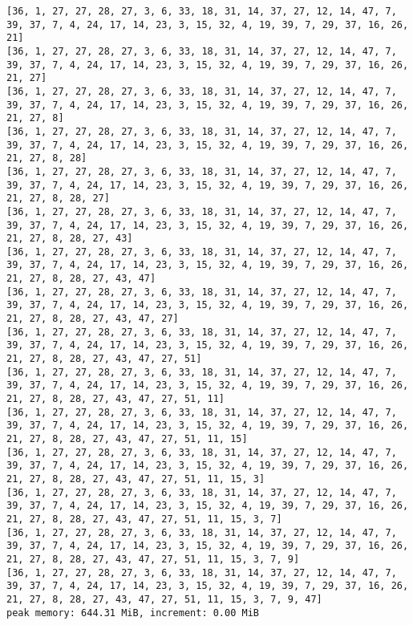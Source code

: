 \documentclass[11pt]{article}
\begin{document}
\begin{Verbatim}[commandchars=\\\{\}]
[36, 1, 27, 27, 28, 27, 3, 6, 33, 18, 31, 14, 37, 27, 12, 14, 47, 7, 39, 37, 7, 4, 24, 17, 14, 23, 3, 15, 32, 4, 19, 39, 7, 29, 37, 16, 26, 21]
[36, 1, 27, 27, 28, 27, 3, 6, 33, 18, 31, 14, 37, 27, 12, 14, 47, 7, 39, 37, 7, 4, 24, 17, 14, 23, 3, 15, 32, 4, 19, 39, 7, 29, 37, 16, 26, 21, 27]
[36, 1, 27, 27, 28, 27, 3, 6, 33, 18, 31, 14, 37, 27, 12, 14, 47, 7, 39, 37, 7, 4, 24, 17, 14, 23, 3, 15, 32, 4, 19, 39, 7, 29, 37, 16, 26, 21, 27, 8]
[36, 1, 27, 27, 28, 27, 3, 6, 33, 18, 31, 14, 37, 27, 12, 14, 47, 7, 39, 37, 7, 4, 24, 17, 14, 23, 3, 15, 32, 4, 19, 39, 7, 29, 37, 16, 26, 21, 27, 8, 28]
[36, 1, 27, 27, 28, 27, 3, 6, 33, 18, 31, 14, 37, 27, 12, 14, 47, 7, 39, 37, 7, 4, 24, 17, 14, 23, 3, 15, 32, 4, 19, 39, 7, 29, 37, 16, 26, 21, 27, 8, 28, 27]
[36, 1, 27, 27, 28, 27, 3, 6, 33, 18, 31, 14, 37, 27, 12, 14, 47, 7, 39, 37, 7, 4, 24, 17, 14, 23, 3, 15, 32, 4, 19, 39, 7, 29, 37, 16, 26, 21, 27, 8, 28, 27, 43]
[36, 1, 27, 27, 28, 27, 3, 6, 33, 18, 31, 14, 37, 27, 12, 14, 47, 7, 39, 37, 7, 4, 24, 17, 14, 23, 3, 15, 32, 4, 19, 39, 7, 29, 37, 16, 26, 21, 27, 8, 28, 27, 43, 47]
[36, 1, 27, 27, 28, 27, 3, 6, 33, 18, 31, 14, 37, 27, 12, 14, 47, 7, 39, 37, 7, 4, 24, 17, 14, 23, 3, 15, 32, 4, 19, 39, 7, 29, 37, 16, 26, 21, 27, 8, 28, 27, 43, 47, 27]
[36, 1, 27, 27, 28, 27, 3, 6, 33, 18, 31, 14, 37, 27, 12, 14, 47, 7, 39, 37, 7, 4, 24, 17, 14, 23, 3, 15, 32, 4, 19, 39, 7, 29, 37, 16, 26, 21, 27, 8, 28, 27, 43, 47, 27, 51]
[36, 1, 27, 27, 28, 27, 3, 6, 33, 18, 31, 14, 37, 27, 12, 14, 47, 7, 39, 37, 7, 4, 24, 17, 14, 23, 3, 15, 32, 4, 19, 39, 7, 29, 37, 16, 26, 21, 27, 8, 28, 27, 43, 47, 27, 51, 11]
[36, 1, 27, 27, 28, 27, 3, 6, 33, 18, 31, 14, 37, 27, 12, 14, 47, 7, 39, 37, 7, 4, 24, 17, 14, 23, 3, 15, 32, 4, 19, 39, 7, 29, 37, 16, 26, 21, 27, 8, 28, 27, 43, 47, 27, 51, 11, 15]
[36, 1, 27, 27, 28, 27, 3, 6, 33, 18, 31, 14, 37, 27, 12, 14, 47, 7, 39, 37, 7, 4, 24, 17, 14, 23, 3, 15, 32, 4, 19, 39, 7, 29, 37, 16, 26, 21, 27, 8, 28, 27, 43, 47, 27, 51, 11, 15, 3]
[36, 1, 27, 27, 28, 27, 3, 6, 33, 18, 31, 14, 37, 27, 12, 14, 47, 7, 39, 37, 7, 4, 24, 17, 14, 23, 3, 15, 32, 4, 19, 39, 7, 29, 37, 16, 26, 21, 27, 8, 28, 27, 43, 47, 27, 51, 11, 15, 3, 7]
[36, 1, 27, 27, 28, 27, 3, 6, 33, 18, 31, 14, 37, 27, 12, 14, 47, 7, 39, 37, 7, 4, 24, 17, 14, 23, 3, 15, 32, 4, 19, 39, 7, 29, 37, 16, 26, 21, 27, 8, 28, 27, 43, 47, 27, 51, 11, 15, 3, 7, 9]
[36, 1, 27, 27, 28, 27, 3, 6, 33, 18, 31, 14, 37, 27, 12, 14, 47, 7, 39, 37, 7, 4, 24, 17, 14, 23, 3, 15, 32, 4, 19, 39, 7, 29, 37, 16, 26, 21, 27, 8, 28, 27, 43, 47, 27, 51, 11, 15, 3, 7, 9, 47]
peak memory: 644.31 MiB, increment: 0.00 MiB

\end{Verbatim}
\end{document}
